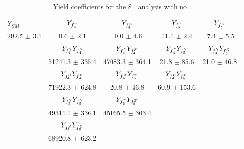 \begin{table}[htbp]
\small
\centering
\begin{tabular}{lcccc}
\hline\hline
       $Y_{SM}$ &             $Y_{f_{4}^{\gamma}}$ &             $Y_{f_{4}^{Z}}$ &             $Y_{f_{5}^{\gamma}}$ &             $Y_{f_{5}^{Z}}$ \\
292.5 $\pm$ 3.1 &             0.6 $\pm$ 2.1 &            -9.0 $\pm$ 4.6 &            11.1 $\pm$ 2.4 &            -7.4 $\pm$ 5.5 \\
\hline
                &  $Y_{f_{4}^{\gamma}}Y_{f_{4}^{\gamma}}$ &  $Y_{f_{4}^{\gamma}}Y_{f_{4}^{Z}}$ &  $Y_{f_{4}^{\gamma}}Y_{f_{5}^{\gamma}}$ &  $Y_{f_{4}^{\gamma}}Y_{f_{5}^{Z}}$ \\
                &       51241.3 $\pm$ 335.4 &       47083.3 $\pm$ 364.1 &           21.8 $\pm$ 85.6 &           21.0 $\pm$ 46.8 \\
\hline
                &  $Y_{f_{4}^{Z}}Y_{f_{4}^{Z}}$ &  $Y_{f_{4}^{Z}}Y_{f_{5}^{\gamma}}$ &  $Y_{f_{4}^{Z}}Y_{f_{5}^{Z}}$ \\
                &       71922.3 $\pm$ 624.8 &           20.8 $\pm$ 46.8 &          60.9 $\pm$ 153.6 \\
\hline
                &  $Y_{f_{5}^{\gamma}}Y_{f_{5}^{\gamma}}$ &  $Y_{f_{5}^{\gamma}}Y_{f_{5}^{Z}}$ \\
                &       49311.1 $\pm$ 336.1 &       45165.5 $\pm$ 363.4 \\
\hline
                &  $Y_{f_{5}^{Z}}Y_{f_{5}^{Z}}$ \\
                &       68920.8 $\pm$ 623.2 \\
\hline\hline
\end{tabular}
\caption{Yield coefficients for the 8~\tev\ analysis with no \formfactor.}
\label{table:TGC-yieldCoeffs-eight-noFF}
\end{table}


